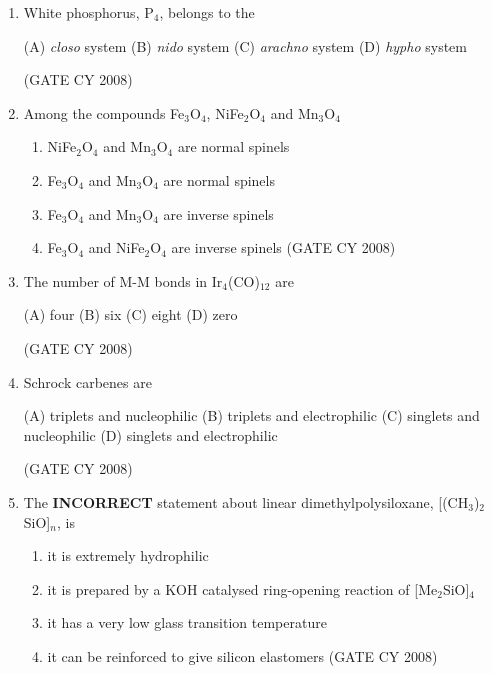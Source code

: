 \documentclass[12pt]{article}
\begin{document}
\begin{enumerate}
\item White phosphorus, P$_4$, belongs to the
\begin{multicols}{4}
(A) \textit{closo} system 
(B) \textit{nido} system 
(C) \textit{arachno} system 
(D) \textit{hypho} system      
\end{multicols}
  \hfill{(GATE CY 2008)}


\item Among the compounds Fe$_3$O$_4$, NiFe$_2$O$_4$ and Mn$_3$O$_4$
\begin{enumerate}
\item NiFe$_2$O$_4$ and Mn$_3$O$_4$ are normal spinels
\item Fe$_3$O$_4$ and Mn$_3$O$_4$ are normal spinels
\item Fe$_3$O$_4$ and Mn$_3$O$_4$ are inverse spinels
\item Fe$_3$O$_4$ and NiFe$_2$O$_4$ are inverse spinels    \hfill{(GATE CY 2008)}
\end{enumerate}





\item The number of M-M bonds in Ir$_4$(CO)$_{12}$ are
\begin{multicols}{2}
(A) four 
(B) six 
(C) eight 
(D) zero     
\end{multicols}
   \hfill{(GATE CY 2008)}


\item Schrock carbenes are

\begin{multicols}{2}
(A) triplets and nucleophilic 
(B) triplets and electrophilic
(C) singlets and nucleophilic 
(D) singlets and electrophilic
\end{multicols}
\hfill{(GATE CY 2008)}




\item The \textbf{INCORRECT} statement about linear dimethylpolysiloxane, [(CH$_3$)$_2$SiO]$_n$, is
\begin{enumerate}
\item it is extremely hydrophilic
\item it is prepared by a KOH catalysed ring-opening reaction of [Me$_2$SiO]$_4$
\item it has a very low glass transition temperature
\item it can be reinforced to give silicon elastomers    \hfill{(GATE CY 2008)}

\end{enumerate}





\end{enumerate}
\end{document}
